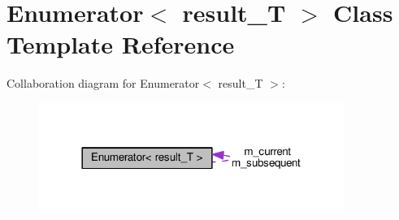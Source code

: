 \hypertarget{classEnumerator}{}\section{Enumerator$<$ result\+\_\+T $>$ Class Template Reference}
\label{classEnumerator}


Collaboration diagram for Enumerator$<$ result\+\_\+T $>$\+:
\nopagebreak
\begin{figure}[H]
\begin{center}
\leavevmode
\includegraphics[width=282pt]{classEnumerator__coll__graph}
\end{center}
\end{figure}
